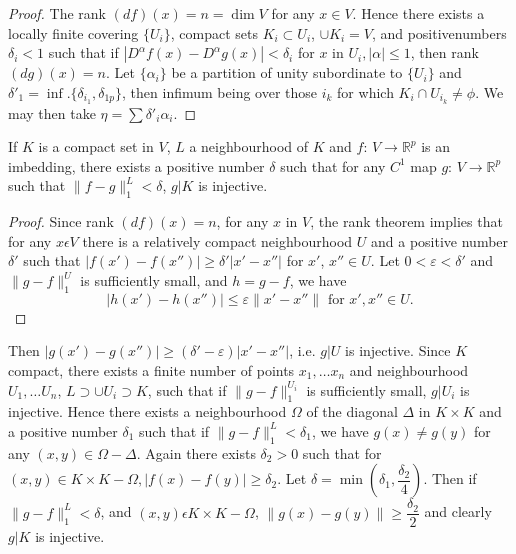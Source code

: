 \begin{proof}
  The rank $(df) (x) = n =\dim V$ for any $x \in V$. Hence there exists
  a locally finite covering $\{ U_i \}$, compact sets $K_i \subset
  U_i$, $\cup K_i = V$, and positive\pageoriginale numbers $\delta_i<1$ such that if
  $|D^ \alpha f(x) - D^ \alpha g(x)|< \delta_i$ for $x$ in $U_i
  ,|\alpha| \leq 1$, then rank $(dg)(x)=n$. Let $\{ \alpha_i \}$ be a
  partition of unity subordinate to $\{ U_i \}$ and $\delta'_1
  =\inf. \{ \delta_{i_1}, \delta_{1p} \}$, then infimum being over
  those $i_k$ for which $K_i \cap U_{i_k} \neq \phi$. We may then
  take $\eta = \sum \delta '_ i \alpha_i$. 
\end{proof}

\setcounter{lemma}{0}
\begin{lemma}\label{chap2:sec9:lem1} %
  If $K$ is a compact set in $V$, $L$ a neighbourhood of $K$ and $f$:
  $V \to \mathbb{R}^p$ is an imbedding, there exists a positive number
  $\delta$ such that for any $C^1$ map $g$: $V \to \mathbb{R}^p$ such that
  $\parallel f-g \parallel ^L_1 < \delta$, $g | K$ is injective.  
\end{lemma}

\begin{proof}
  Since rank $(df)(x)=n$, for any $x$ in $V$, the rank theorem implies
  that for any $x \epsilon V$ there is a relatively compact
  neighbourhood $U$ and a positive number $\delta '$ such that
  $|f(x')-f(x'')|\geq \delta '|x'-x''|$ for $x'$, $x'' \in U$. Let $0
  < \varepsilon < \delta'$ and $\parallel g-f \parallel ^U_1$ is
  sufficiently small, and $h=g-f$, we have 
  $$
  |h(x')-h(x'')|\leq \varepsilon \parallel x'-x'' \parallel \text{ for
  } x',x'' \in U. 
  $$
\end{proof}

Then $|g(x')-g(x'')|\geq (\delta'-\varepsilon) |x'-x''|$, i.e. $g|U$ is
injective. Since $K$ compact, there exists a finite number of points
$x_1, \ldots x_n$ and neighbourhood $U_1, \ldots U_n$, $L \supset \cup
U_i \supset K$, such that if $\parallel g-f \parallel^{U_i}_1$ is
sufficiently small, $g|U_i$ is injective. Hence there exists a
neighbourhood $\Omega$ of the diagonal $\Delta$ in $K \times K$ and a
positive number $\delta_1$ such that if $\parallel g-f \parallel ^L_1
< \delta _1$, we have $g(x)\neq g(y)$ for any $(x,y)\in \Omega
-\Delta$. Again there exists $\delta _2 > 0$ such that for $(x,y)\in
K \times K- \Omega, |f(x)-f(y)|\geq \delta_2$. Let $\delta= \min
(\delta_1 ,\dfrac{\delta_2}{4})$. Then if $\parallel g-f \parallel^L_1
< \delta$, and $(x,y)\epsilon K \times K- \Omega$, $\parallel
g(x)-g(y) \parallel \geq \dfrac{ \delta_2}{2}$ and clearly $g|K$ is
injective. 

